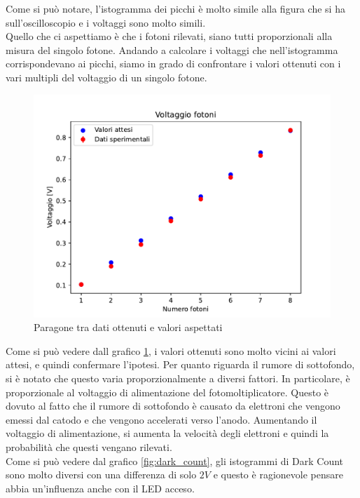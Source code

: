 Come si può notare, l'istogramma dei picchi è molto simile alla figura che si ha sull'oscilloscopio e i voltaggi sono molto simili.\\
Quello che ci aspettiamo è che i fotoni rilevati, siano tutti proporzionali alla misura del singolo fotone. Andando a calcolare i voltaggi che nell'istogramma corrispondevano ai picchi, siamo in grado di confrontare i valori ottenuti con i vari multipli del voltaggio di un singolo fotone.\\


\begin{figure}
    \centering
    \includegraphics[width=\linewidth]{Photomultiplier/assets/Voltaggio_fotoni.pdf}
    \caption{Paragone tra dati ottenuti e valori aspettati}
    \label{fig:voltaggio_fotoni}
\end{figure}

Come si può vedere dall grafico \ref{fig:voltaggio_fotoni}, i valori ottenuti sono molto vicini ai valori attesi, e quindi confermare l'ipotesi.
Per quanto riguarda il rumore di sottofondo, si è notato che questo varia proporzionalmente a diversi fattori. In particolare, è proporzionale al voltaggio di alimentazione del fotomoltiplicatore. Questo è dovuto al fatto che il rumore di sottofondo è causato da elettroni che vengono emessi dal catodo e che vengono accelerati verso l'anodo. Aumentando il voltaggio di alimentazione, si aumenta la velocità degli elettroni e quindi la probabilità che questi vengano rilevati.\\

Come si può vedere dal grafico \ref{fig:dark_count}, gli istogrammi di Dark Count sono molto diversi con una differenza di solo $2V$ e questo è ragionevole pensare abbia un'influenza anche con il LED acceso.\\

